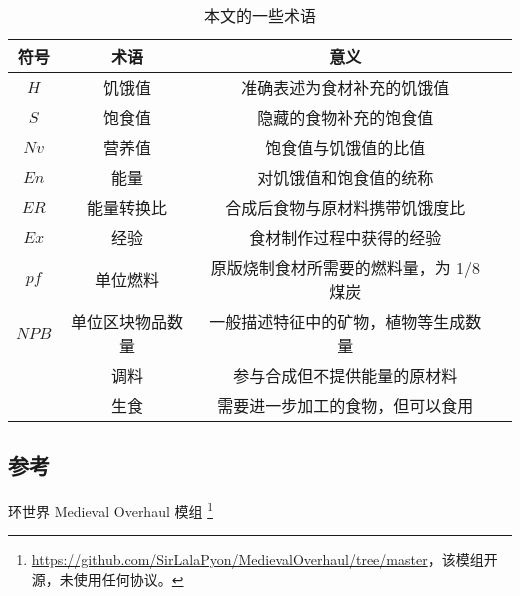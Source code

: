 \begin{center}
    \setlength{\tabcolsep}{4mm}
    \begin{longtable}{c|ccc}
        \caption{本文的一些术语} \\
        \toprule
        \textbf{符号} & \textbf{术语} & \textbf{意义} \\
        \midrule
        $H$ & 饥饿值 & 准确表述为食材补充的饥饿值 \\
        $S$ & 饱食值 & 隐藏的食物补充的饱食值 \\
        $Nv$ & 营养值 & 饱食值与饥饿值的比值 \\
        $En$ & 能量 & 对饥饿值和饱食值的统称 \\
        $ER$ & 能量转换比 & 合成后食物与原材料携带饥饿度比 \\
        $Ex$ & 经验 & 食材制作过程中获得的经验 \\
        $pf$ & 单位燃料 & 原版烧制食材所需要的燃料量，为 1/8 煤炭 \\
        $NPB$ & 单位区块物品数量 & 一般描述特征中的矿物，植物等生成数量 \\
        & 调料 & 参与合成但不提供能量的原材料 \\
        & 生食 & 需要进一步加工的食物，但可以食用 \\
        \bottomrule
    \end{longtable}
\end{center}

\subsection{参考}

环世界 Medieval Overhaul 模组 \footnote{\url{https://github.com/SirLalaPyon/MedievalOverhaul/tree/master}，该模组开源，未使用任何协议。}

\newpage